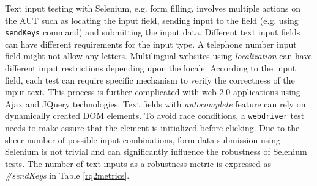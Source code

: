 Text input testing with Selenium, e.g. form filling, involves multiple actions on the AUT such as locating the input field, sending input to the field (e.g. using \texttt{sendKeys} command) and submitting the input data. Different text input fields can have different requirements for the input type. A telephone number input field might not allow any letters. Multilingual websites using \textit{localization} can have different input restrictions depending upon the locale. According to the input field, each test can require specific mechanism to verify the correctness of the input text. This process is further complicated with web 2.0 applications using Ajax and JQuery technologies. Text fields with \textit{autocomplete} feature can rely on dynamically created DOM elements. To avoid race conditions, a \texttt{webdriver} test needs to make assure that the element is initialized before clicking. Due to the sheer number of possible input combinations, form data submission using Selenium is not trivial and can significantly influence the robustness of Selenium tests. The number of text inputs as a robustness metric is expressed as \textit{\#sendKeys} in Table \ref{rq2metrics}. 
